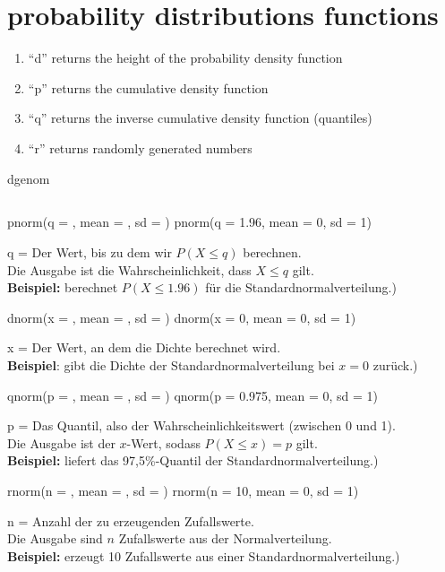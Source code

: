 \section{probability distributions functions}

\begin{enumerate}
    \item “d” returns the height of the probability density function
    \item “p” returns the cumulative density function
    \item “q” returns the inverse cumulative density function (quantiles)
    \item “r” returns randomly generated numbers
\end{enumerate}
dgenom
\subsection{}
\begin{rcode}{1}
pnorm(q = , mean = , sd = )
pnorm(q = 1.96, mean = 0, sd = 1)

\end{rcode}
q = Der Wert, bis zu dem wir \(P(X \le q)\) berechnen.\\
Die Ausgabe ist die Wahrscheinlichkeit, dass \(X \le q\) gilt.\\
\textbf{Beispiel:} berechnet \(P(X \le 1.96)\) für die Standardnormalverteilung.)\\
\begin{rcode}{1}
dnorm(x = , mean = , sd = )
dnorm(x = 0, mean = 0, sd = 1)
\end{rcode}
x = Der Wert, an dem die Dichte berechnet wird.\\
\textbf{Beispiel}: gibt die Dichte der Standardnormalverteilung bei \(x = 0\) zurück.)

\bigskip

\begin{rcode}{1}
qnorm(p = , mean = , sd = )
qnorm(p = 0.975, mean = 0, sd = 1)
\end{rcode}
p = Das Quantil, also der Wahrscheinlichkeitswert (zwischen 0 und 1).\\
Die Ausgabe ist der \(x\)-Wert, sodass \(P(X \le x) = p\) gilt.\\
\textbf{Beispiel:} liefert das 97,5\%-Quantil der Standardnormalverteilung.)
\begin{rcode}{1}
rnorm(n = , mean = , sd = )
rnorm(n = 10, mean = 0, sd = 1)
\end{rcode}
n = Anzahl der zu erzeugenden Zufallswerte.\\
Die Ausgabe sind \(n\) Zufallswerte aus der Normalverteilung.\\
\textbf{Beispiel:} erzeugt 10 Zufallswerte aus einer Standardnormalverteilung.)

